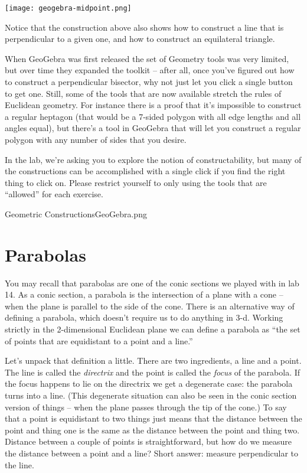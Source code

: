 \centerline{\texttt{[image: geogebra-midpoint.png]}}

Notice that the construction above also shows how to construct a line that is perpendicular to a given one, and how to construct an equilateral triangle.

When GeoGebra was first released the set of Geometry tools was very limited, but over time they expanded the toolkit -- after all, once you've figured out how to construct a perpendicular bisector, why not just let you click a single button to get one.  Still, some of the tools that are now available stretch the rules of Euclidean geometry.  For instance there is a proof that it's impossible to construct a regular heptagon (that would be a 7-sided polygon with all edge lengths and all angles equal), but there's a tool in GeoGebra that will let you construct a regular polygon with any number of sides that you desire.

In the lab, we're asking you to explore the notion of constructability, but many of the constructions can be accomplished with a single click if you find the right thing to click on.  Please restrict yourself to only using the tools that are ``allowed'' for each exercise.

 \clearpage
 \begin{worksheet}{15}{Geometric Constructions}{GeoGebra.png}
 
 \end{worksheet}
 \clearpage

\section{Parabolas}

You may recall that parabolas are one of the conic sections we played with in lab 14.  As a conic section, a parabola is the intersection of a plane with a cone -- when the plane is parallel to the side of the cone.  There is an alternative way of defining a parabola, which doesn't require us to do anything in 3-d.  Working strictly in the 2-dimensional Euclidean plane we can define a parabola as ``the set of points that are equidistant to a point and a line.''

Let's unpack that definition a little.  There are two ingredients, a line and a point.  The line is called the {\em directrix} and the point is called the {\em focus} of the parabola.  If the focus happens to lie on the directrix we get a degenerate case: the parabola turns into a line.  (This degenerate situation can also be seen in the conic section version of things -- when the plane passes through the tip of the cone.)  To say that a point is equidistant to two things just means that the distance between the point and thing one is the same as the distance between the point and thing two.  Distance between a couple of points is straightforward, but how do we measure the distance between a point and a line?  Short answer: measure perpendicular to the line.

